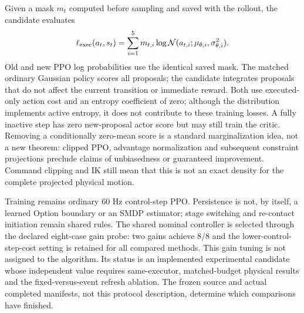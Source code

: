Given a mask $m_t$ computed before sampling and saved with the rollout, the candidate evaluates
\begin{equation}
 \ell_{\rm exec}(a_t,s_t)=\sum_{i=1}^{5}m_{t,i}
 \log\mathcal{N}(a_{t,i};\mu_{\theta,i},\sigma_{\theta,i}^2).
\end{equation}
Old and new PPO log probabilities use the identical saved mask. The matched ordinary Gaussian policy scores all proposals; the candidate integrates proposals that do not affect the current transition or immediate reward. Both use executed-only action cost and an entropy coefficient of zero; although the distribution implements active entropy, it does not contribute to these training losses. A fully inactive step has zero new-proposal actor score but may still train the critic. Removing a conditionally zero-mean score is a standard marginalization idea, not a new theorem: clipped PPO, advantage normalization and subsequent constraint projections preclude claims of unbiasedness or guaranteed improvement. Command clipping and IK still mean that this is not an exact density for the complete projected physical motion.

Training remains ordinary 60 Hz control-step PPO. Persistence is not, by itself, a learned Option boundary or an SMDP estimator; stage switching and re-contact initiation remain shared rules. The shared nominal controller is selected through the declared eight-case gain probe: two gains achieve 8/8 and the lower-control-step-cost setting is retained for all compared methods. This gain tuning is not assigned to the algorithm. Its status is an implemented experimental candidate whose independent value requires same-executor, matched-budget physical results and the fixed-versus-event refresh ablation. The frozen source and actual completed manifests, not this protocol description, determine which comparisons have finished.

